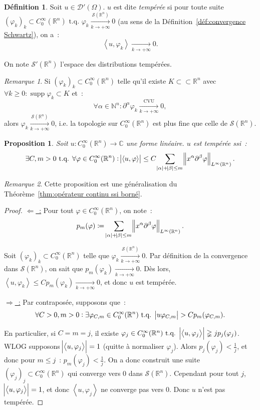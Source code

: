 \documentclass{report}
\DeclareMathOperator{\supp}{supp}
\newcommand{\C}{{\mathbb C}}
\newcommand{\R}{{\mathbb R}}
\newcommand{\N}{{\mathbb N}}
\newcommand{\scpr}[2]{\left\langle#1, #2\right\rangle}
\newcommand{\tq}{\text{ t.q. }}
\newcommand{\st}{\tq}
\newcommand{\pinfty}{{+\infty}}
\newtheorem{prp}[thm]{Proposition}
\theoremstyle{definition}
\newtheorem{déf}[thm]{Définition}
\theoremstyle{remark}
\newtheorem*{rmq}{Remarque}
\begin{document}
\begin{déf} Soit $u \in \mathcal D'(\Omega)$. $u$ est dite \textit{tempérée} si pour toute suite
$(\varphi_k)_k \subset C^\infty_0(\R^n) \st \varphi_k \xrightarrow[k \to \pinfty]{\mathcal S(\R^n)} 0$ (au sens de la Définition~\ref{déf:convergence Schwartz}), on a~:
\[\scpr u{\varphi_k} \xrightarrow[k \to \pinfty]{} 0.\]

On note $\mathcal S'(\R^n)$ l'espace des distributions tempérées.
\end{déf}

\begin{rmq} Si $(\varphi_k)_k \subset C^\infty_0(\R^n)$ telle qu'il existe $K \subset\subset \R^n$ avec $\forall k \geq 0 : \supp \varphi_k \subset K$ et~:
\[\forall \alpha \in \N^n : \partial^\alpha \varphi_k \xrightarrow[k \to \pinfty]{\text{CVU}} 0,\]
alors $\varphi_k \xrightarrow[k \to \pinfty]{\mathcal S(\R^n)} 0$, i.e. la topologie sur $C^\infty_0(\R^n)$ est plus fine que celle de $\mathcal S(\R^n)$.
\end{rmq}

\begin{prp} Soit $u : C^\infty_0(\R^n) \to \C$ une forme linéaire. $u$ est tempérée ssi~:
\[\exists C, m > 0 \st \forall \varphi \in C^\infty_0(\R^n) : \abs {\scpr u\varphi} \leq C\sum_{\abs \alpha + \abs \beta \leq m}\norm {x^\alpha\partial^\beta\varphi}_{L^\infty(\R^n)}.\]
\end{prp}

\begin{rmq}Cette proposition est une généralisation du Théorème~\ref{thm:opérateur continu ssi borné}.
\end{rmq}

\begin{proof} \underline {$\Leftarrow$~:} Pour tout $\varphi \in C^\infty_0(\R^n)$, on note~:
\[p_m(\varphi) \coloneqq \sum_{\abs \alpha + \abs\beta \leq m}\norm {x^\alpha\partial^\beta\varphi}_{L^\infty(\R^n)}.\]

Soit $(\varphi_k)_k \subset C^\infty_0(\R^n)$ telle que $\varphi_k \xrightarrow[k \to \pinfty]{\mathcal S(\R^n)} 0$. Par définition de la convergence dans $\mathcal S(\R^n)$, on sait
que $p_m(\varphi_k) \xrightarrow[k \to \pinfty]{} 0$. Dès lors, $\scpr u{\varphi_k} \leq Cp_m(\varphi_k) \xrightarrow[k \to \pinfty]{} 0$, et donc $u$ est tempérée.

\underline {$\Rightarrow$~:} Par contraposée, supposons que~:
\[\forall C > 0, m > 0 : \exists \varphi_{C,m} \in C^\infty_0(\R^n) \st \abs {u{\varphi_{C,m}}} > Cp_m(\varphi_{C,m}).\]

En particulier, si $C=m=j$, il existe $\varphi_j \in C^\infty_0(\R^n) \st \abs {\scpr u{\varphi_j}} \gneqq jp_j(\varphi_j)$. WLOG supposons $\abs {\scpr u{\varphi_j}}=1$
(quitte à normaliser $\varphi_j$). Alors $p_j(\varphi_j) < \frac 1j$, et donc pour $m \leq j$~: $p_m(\varphi_j) < \frac 1j$. On a donc construit une suite
$(\varphi_j)_j \subset C^\infty_0(\R^n)$ qui converge vers 0 dans $\mathcal S(\R^n)$. Cependant pour tout $j$, $\abs {\scpr u{\varphi_j}} = 1$, et donc $\scpr u{\varphi_j}$
ne converge pas vers 0. Donc $u$ n'est pas tempérée.
\end{proof}
\end{document}
